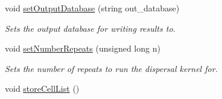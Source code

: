 \begin{DoxyCompactItemize}
\item 
void \hyperlink{class_simulate_dispersal_acae5067045d5989df6d7dce80bcfe276}{set\+Output\+Database} (string out\+\_\+database)
\begin{DoxyCompactList}\small\item\em Sets the output database for writing results to. \end{DoxyCompactList}\item 
void \hyperlink{class_simulate_dispersal_a29c7cf41d8b5610109d61f302fb32e73}{set\+Number\+Repeats} (unsigned long n)
\begin{DoxyCompactList}\small\item\em Sets the number of repeats to run the dispersal kernel for. \end{DoxyCompactList}\item 
void \hyperlink{class_simulate_dispersal_a85d8ee68e5f4962429571c835aa028b4}{store\+Cell\+List} ()\hypertarget{class_simulate_dispersal_a85d8ee68e5f4962429571c835aa028b4}{}\label{class_simulate_dispersal_a85d8ee68e5f4962429571c835aa028b4}


\end{DoxyCompactItemize}
